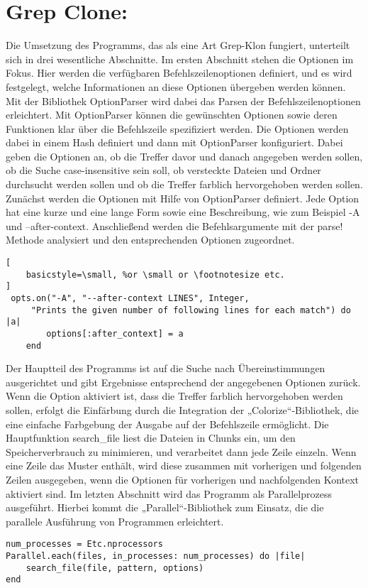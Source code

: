 \documentclass{article}
\begin{document}
\section*{Grep Clone:}
Die Umsetzung des Programms, das als eine Art Grep-Klon fungiert, unterteilt sich in drei wesentliche Abschnitte. Im ersten Abschnitt stehen die Optionen im Fokus. Hier werden die verfügbaren Befehlszeilenoptionen definiert, und es wird festgelegt, welche Informationen an diese Optionen übergeben werden können. Mit der Bibliothek OptionParser wird dabei das Parsen der Befehlszeilenoptionen erleichtert. Mit OptionParser können die gewünschten Optionen sowie deren Funktionen klar über die Befehlszeile spezifiziert werden. Die Optionen werden dabei in einem Hash definiert und dann mit OptionParser konfiguriert. Dabei geben die Optionen an, ob die Treffer davor und danach angegeben werden sollen, ob die Suche case-insensitive sein soll, ob versteckte Dateien und Ordner durchsucht werden sollen und ob die Treffer farblich hervorgehoben werden sollen. Zunächst werden die Optionen mit Hilfe von OptionParser definiert. Jede Option hat eine kurze und eine lange Form sowie eine Beschreibung, wie zum Beispiel -A und --after-context. Anschließend werden die Befehlsargumente mit der parse! Methode analysiert und den entsprechenden Optionen zugeordnet. 
 \begin{lstlisting}[
    basicstyle=\small, %or \small or \footnotesize etc.
]
 opts.on("-A", "--after-context LINES", Integer,
	 "Prints the given number of following lines for each match") do |a|
        options[:after_context] = a
    end
\end{lstlisting}
Der Hauptteil des Programms ist auf die Suche nach Übereinstimmungen ausgerichtet und gibt Ergebnisse entsprechend der angegebenen Optionen zurück. Wenn die Option aktiviert ist, dass die Treffer farblich hervorgehoben werden sollen, erfolgt die Einfärbung durch die Integration der „Colorize“-Bibliothek, die eine einfache Farbgebung der Ausgabe auf der Befehlszeile ermöglicht.
Die Hauptfunktion search\_file liest die Dateien in Chunks ein, um den Speicherverbrauch zu minimieren, und verarbeitet dann jede Zeile einzeln. Wenn eine Zeile das Muster enthält, wird diese zusammen mit vorherigen und folgenden Zeilen ausgegeben, wenn die Optionen für vorherigen und nachfolgenden Kontext aktiviert sind.
Im letzten Abschnitt wird das Programm als Parallelprozess ausgeführt. Hierbei kommt die „Parallel“-Bibliothek zum Einsatz, die die parallele Ausführung von Programmen erleichtert.
\begin{lstlisting}
num_processes = Etc.nprocessors
Parallel.each(files, in_processes: num_processes) do |file|
    search_file(file, pattern, options)
end
 \end{lstlisting}
\end{document}

